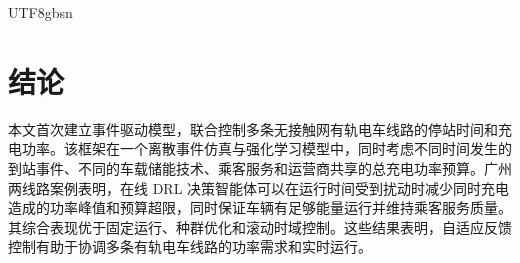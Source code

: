 \documentclass[conference]{IEEEtran}
\begin{document}
\begin{CJK*}{UTF8}{gbsn}
\section{结论}
本文首次建立事件驱动模型，联合控制多条无接触网有轨电车线路的停站时间和充电功率。该框架在一个离散事件仿真与强化学习模型中，同时考虑不同时间发生的到站事件、不同的车载储能技术、乘客服务和运营商共享的总充电功率预算。广州两线路案例表明，在线 DRL 决策智能体可以在运行时间受到扰动时减少同时充电造成的功率峰值和预算超限，同时保证车辆有足够能量运行并维持乘客服务质量。其综合表现优于固定运行、种群优化和滚动时域控制。这些结果表明，自适应反馈控制有助于协调多条有轨电车线路的功率需求和实时运行。




\end{CJK*}
\end{document}
